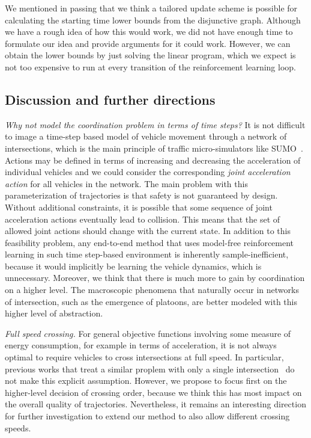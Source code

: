 \documentclass[notitlepage]{report}
\begin{document}
We mentioned in passing that we think a tailored update scheme is possible for
calculating the starting time lower bounds from the disjunctive graph. Although
we have a rough idea of how this would work, we did not have enough time to
formulate our idea and provide arguments for it could work. However, we can
obtain the lower bounds by just solving the linear program, which we expect is
not too expensive to run at every transition of the reinforcement learning loop.

\subsection*{Discussion and further directions}


\textit{Why not model the coordination problem in terms of time steps?}
%
It is not difficult to image a time-step based model of vehicle movement through
a network of intersections, which is the main principle of traffic
micro-simulators like SUMO~\cite{lopezMicroscopicTrafficSimulation2018}. Actions may be defined in terms of increasing
and decreasing the acceleration of individual vehicles and we could consider the
corresponding \textit{joint acceleration action} for all vehicles in the network.
%
The main problem with this parameterization of trajectories is that safety is
not guaranteed by design. Without additional constraints, it is possible that
some sequence of joint acceleration actions eventually lead to collision. This
means that the set of allowed joint actions should change with the current
state.
%
In addition to this feasibility problem, any end-to-end method that uses
model-free reinforcement learning in such time step-based environment is
inherently sample-inefficient, because it would implicitly be learning the
vehicle dynamics, which is unnecessary.
%
Moreover, we think that there is much more to gain by coordination on a higher
level. The macroscopic phenomena that naturally occur in networks of
intersection, such as the emergence of platoons, are better modeled with this
higher level of abstraction.

\vspace{0.5em}\noindent
\textit{Full speed crossing.} For general objective functions involving some
measure of energy consumption, for example in terms of acceleration, it is not
always optimal to require vehicles to cross intersections at full speed. In
particular, previous works that treat a similar proplem with only a single
intersection~\cite{hultApproximateSolutionOptimal2015,zhaoBilevelProgrammingModel2021}
do not make this explicit assumption. However, we propose to focus first on the
higher-level decision of crossing order, because we think this has most impact
on the overall quality of trajectories. Nevertheless, it remains an interesting
direction for further investigation to extend our method to also allow different
crossing speeds.
\end{document}
